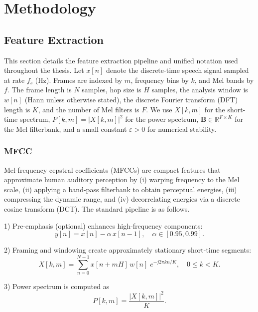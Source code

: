 
\chapter{Methodology}


\section{Feature Extraction}

This section details the feature extraction pipeline and unified notation used throughout the thesis. Let \(x[n]\) denote the discrete-time speech signal sampled at rate \(f_s\) (Hz). Frames are indexed by \(m\), frequency bins by \(k\), and Mel bands by \(f\). The frame length is \(N\) samples, hop size is \(H\) samples, the analysis window is \(w[n]\) (Hann unless otherwise stated), the discrete Fourier transform (DFT) length is \(K\), and the number of Mel filters is \(F\). We use \(X[k,m]\) for the short-time spectrum, \(P[k,m] = |X[k,m]|^2\) for the power spectrum, \(\mathbf{B} \in \mathbb{R}^{F\times K}\) for the Mel filterbank, and a small constant \(\varepsilon>0\) for numerical stability.

\subsection{MFCC}

Mel-frequency cepstral coefficients (MFCCs) are compact features that approximate human auditory perception by (i) warping frequency to the Mel scale, (ii) applying a band-pass filterbank to obtain perceptual energies, (iii) compressing the dynamic range, and (iv) decorrelating energies via a discrete cosine transform (DCT). The standard pipeline is as follows.

1) Pre-emphasis (optional) enhances high-frequency components:
\begin{equation}\label{eq:preemphasis}
y[n] = x[n] - \alpha\, x[n-1], \quad \alpha \in [0.95, 0.99].
\end{equation}

2) Framing and windowing create approximately stationary short-time segments:
\begin{equation}\label{eq:stft}
X[k,m] = \sum_{n=0}^{N-1} x[n+mH]\, w[n] \; e^{-j 2\pi k n / K}, \quad 0 \le k < K.
\end{equation}

3) Power spectrum is computed as
\begin{equation}\label{eq:power}
P[k,m] = \frac{|X[k,m]|^2}{K}.
\end{equation}

